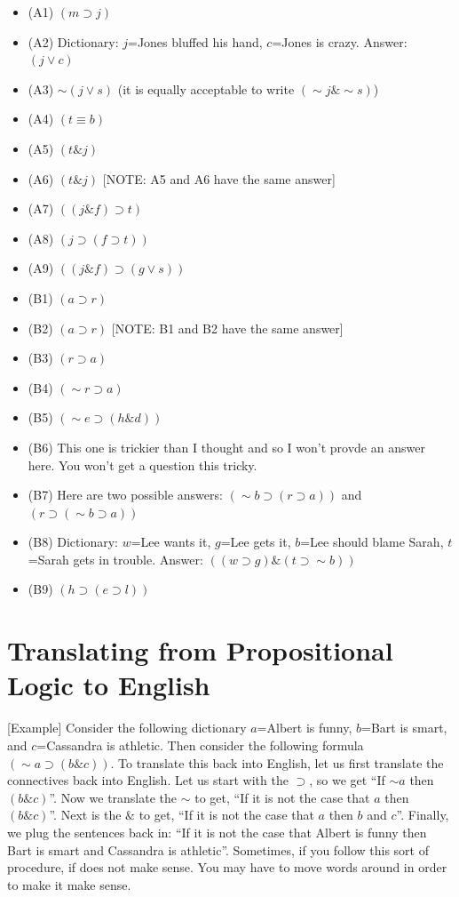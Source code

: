 \documentclass[
]{book}
\providecommand{\tightlist}{%
  \setlength{\itemsep}{0pt}\setlength{\parskip}{0pt}}
\begin{document}
\begin{itemize}
\tightlist
\item
  (A1) \((m \supset j)\)
\item
  (A2) Dictionary: \(j\)=Jones bluffed his hand, \(c\)=Jones is crazy. Answer: \((j \lor c)\)
\item
  (A3) \(\sim(j \lor s)\) (it is equally acceptable to write \((\sim j \& \sim s)\))
\item
  (A4) \((t \equiv b)\)
\item
  (A5) \((t \& j)\)
\item
  (A6) \((t \& j)\) {[}NOTE: A5 and A6 have the same answer{]}
\item
  (A7) \(((j \& f) \supset t)\)
\item
  (A8) \((j \supset (f \supset t))\)
\item
  (A9) \(((j \& f) \supset (g \lor s))\)
\item
  (B1) \((a \supset r)\)
\item
  (B2) \((a \supset r)\) {[}NOTE: B1 and B2 have the same answer{]}
\item
  (B3) \((r \supset a)\)
\item
  (B4) \((\sim r\supset a)\)
\item
  (B5) \((\sim e \supset (h \& d))\)
\item
  (B6) This one is trickier than I thought and so I won't provde an answer here. You won't get a question this tricky.
\item
  (B7) Here are two possible answers: \((\sim b \supset (r \supset a))\) and \((r \supset (\sim b \supset a))\)
\item
  (B8) Dictionary: \(w\)=Lee wants it, \(g\)=Lee gets it, \(b\)=Lee should blame Sarah, \(t\)=Sarah gets in trouble. Answer: \(((w \supset g) \& (t \supset \sim b))\)
\item
  (B9) \((h \supset (e \supset l))\)
\end{itemize}

\hypertarget{translating-from-propositional-logic-to-english}{%
\section{Translating from Propositional Logic to English}\label{translating-from-propositional-logic-to-english}}

{[}Example{]} Consider the following dictionary \(a\)=Albert is funny, \(b\)=Bart is smart, and \(c\)=Cassandra is athletic. Then consider the following formula \((\sim a \supset (b \& c))\). To translate this back into English, let us first translate the connectives back into English. Let us start with the \(\supset\), so we get ``If \(\sim a\) then \((b \& c)\)''. Now we translate the \(\sim\) to get, ``If it is not the case that \(a\) then \((b \& c)\)''. Next is the \(\&\) to get, ``If it is not the case that \(a\) then \(b\) and \(c\)''. Finally, we plug the sentences back in: ``If it is not the case that Albert is funny then Bart is smart and Cassandra is athletic''. Sometimes, if you follow this sort of procedure, if does not make sense. You may have to move words around in order to make it make sense.
\end{document}
